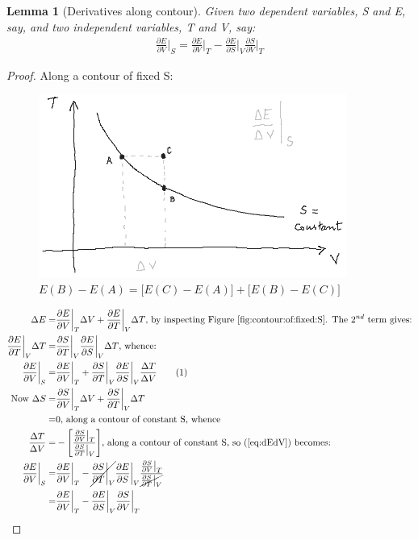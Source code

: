 \documentclass[]{article}
\newcommand\numberthis{\addtocounter{equation}{1}\tag{\theequation}}
\newtheorem{lemma}[thm]{Lemma}
\begin{document}
\begin{lemma}[Derivatives along contour]\label{thm:derivative:contour}
	Given two dependent variables, S and E, say, and two independent variables, T and V, say:
	\begin{align*}
		\frac{\partial E}{\partial V}\bigg|_S = \frac{\partial E}{\partial V}\bigg|_T - 	\frac{\partial E}{\partial S}\bigg|_V \frac{\partial S}{\partial V}\bigg|_T
	\end{align*}
\end{lemma}
\begin{proof}
	Along a contour of fixed S:
	\begin{figure}[H]
		\caption{$E(B)-E(A) = \big[E(C)-E(A)\big]+\big[E(B)-E(C)\big]$}\label{fig:contour:of:fixed:S}
		\includegraphics[width=0.9\textwidth]{partial-derivatives}
	\end{figure}
	\begin{align*}
		\Delta E =& \frac{\partial E}{\partial V} \bigg|_T \Delta V + \frac{\partial E}{\partial T} \bigg|_V \Delta T \text{, by inspecting Figure \ref{fig:contour:of:fixed:S}. The $2^{nd}$ term gives:}\\
		\frac{\partial E}{\partial T} \bigg|_V \Delta T=& \frac{\partial S}{\partial T} \bigg|_V \frac{\partial E}{\partial S} \bigg|_V \Delta T\text{, whence:}\\
		\frac{\partial E}{\partial V} \bigg|_S=& \frac{\partial E}{\partial V} \bigg|_T  + \frac{\partial S}{\partial T} \bigg|_V \frac{\partial E}{\partial S} \bigg|_V \frac{\Delta T}{\Delta V} \numberthis\label{eq:dEdV}\\
		\text{Now }\Delta S =& \frac{\partial S}{\partial V} \bigg|_T \Delta V + \frac{\partial S}{\partial T} \bigg|_V \Delta T\\
		=& 0\text{, along a contour of constant S, whence}\\
		\frac{\Delta T}{\Delta V} =& - \Bigg[\frac{\frac{\partial S}{\partial V}\big|_T}{\frac{\partial S}{\partial T}\big|_V}\Bigg]\text{, along a contour of constant S, so (\ref{eq:dEdV}) becomes:}\\
		\frac{\partial E}{\partial V} \bigg|_S=& \frac{\partial E}{\partial V} \bigg|_T  - \cancel{\frac{\partial S}{\partial T} \bigg|_V} \frac{\partial E}{\partial S} \bigg|_V \frac{\frac{\partial S}{\partial V}\big|_T}{\cancel{\frac{\partial S}{\partial T}\big|_V}}\\
		=& \frac{\partial E}{\partial V} \bigg|_T  -  \frac{\partial E}{\partial S} \bigg|_V \frac{\partial S}{\partial V}\bigg|_T
	\end{align*}
\end{proof}
\end{document}
